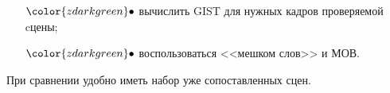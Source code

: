{\begin{itemize}
\begin{itemize}
                \begin{itemize}
                    \item[${\color{zdarkgreen} +}$] надежно, устойчиво к искажениям;
                    \item[${\color{zdarkred} -}$] долго, для каждой пары сцен придется перевычислять особенности.
                \end{itemize}
            \item[${\color{zdarkgreen}\bullet}$] вычислить GIST для нужных кадров проверяемой cцены;
            \item[${\color{zdarkgreen}\bullet}$] воспользоваться <<мешком слов>> и МОВ.
        \end{itemize}
    \end{itemize}
При сравнении удобно иметь набор уже сопоставленных сцен.
}

